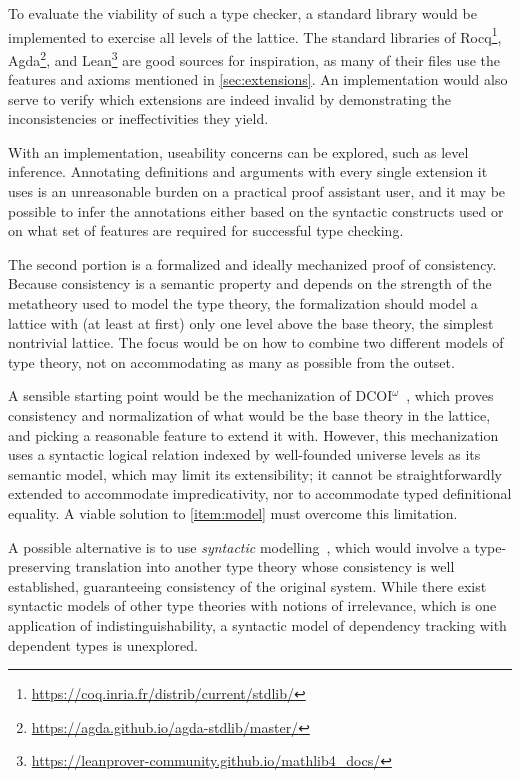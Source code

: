 \documentclass{article}
\begin{document}
To evaluate the viability of such a type checker,
a standard library would be implemented to exercise all levels of the lattice.
The standard libraries of Rocq\footnote{\url{https://coq.inria.fr/distrib/current/stdlib/}},
Agda\footnote{\url{https://agda.github.io/agda-stdlib/master/}},
and Lean\footnote{\url{https://leanprover-community.github.io/mathlib4_docs/}}
are good sources for inspiration,
as many of their files use the features and axioms mentioned in \cref{sec:extensions}.
An implementation would also serve to verify which extensions are indeed invalid
by demonstrating the inconsistencies or ineffectivities they yield.

With an implementation, useability concerns can be explored,
such as level inference.
Annotating definitions and arguments with every single extension it uses
is an unreasonable burden on a practical proof assistant user,
and it may be possible to infer the annotations
either based on the syntactic constructs used
or on what set of features are required for successful type checking.

The second portion is a formalized and ideally mechanized proof of consistency.
Because consistency is a semantic property and depends on the strength
of the metatheory used to model the type theory,
the formalization should model a lattice with (at least at first)
only one level above the base theory, the simplest nontrivial lattice.
The focus would be on how to combine two different models of type theory,
not on accommodating as many as possible from the outset.

A sensible starting point would be the mechanization of DCOI$^\omega$~\cite{dcoi-omega},
which proves consistency and normalization of what would be the base theory in the lattice,
and picking a reasonable feature to extend it with.
However, this mechanization uses a syntactic logical relation
indexed by well-founded universe levels as its semantic model,
which may limit its extensibility;
it cannot be straightforwardly extended to accommodate impredicativity,
nor to accommodate typed definitional equality.
A viable solution to \cref{item:model} must overcome this limitation.

A possible alternative is to use \emph{syntactic} modelling~\citep{syntactic},
which would involve a type-preserving translation into another type theory
whose consistency is well established,
guaranteeing consistency of the original system.
While there exist syntactic models of other type theories \citep{sprop,ghosts}
with notions of irrelevance, which is one application of indistinguishability,
a syntactic model of dependency tracking with dependent types is unexplored.
\end{document}
